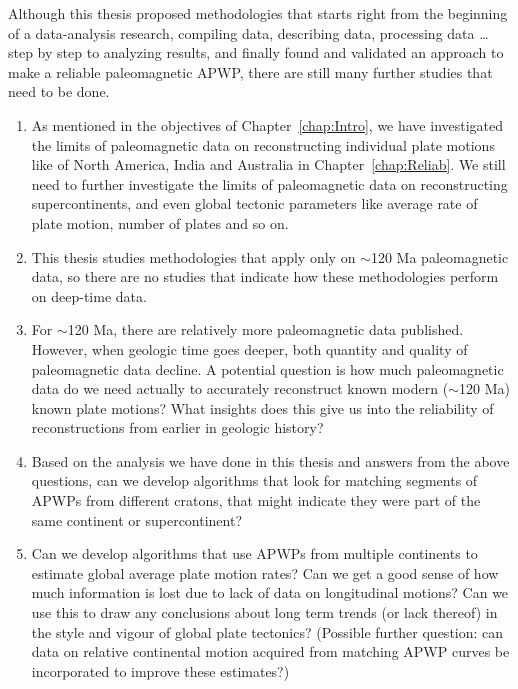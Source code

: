 Although this thesis proposed methodologies that starts right from the
beginning of a data-analysis research, compiling data, describing data,
processing data \ldots step by step to analyzing results, and finally found and
validated an approach to make a reliable paleomagnetic APWP, there are still
many further studies that need to be done.
%
\begin{enumerate}
  \item As mentioned in the objectives of Chapter~\ref{chap:Intro}, we have
  investigated the limits of paleomagnetic data on reconstructing individual
  plate motions like of North America, India and Australia in
  Chapter~\ref{chap:Reliab}. We still need to further investigate the limits of
  paleomagnetic data on reconstructing supercontinents, and even global tectonic
  parameters like average rate of plate motion, number of plates and so on.
  \item This thesis studies methodologies that apply only on
  $\sim$120 Ma paleomagnetic data, so there are no studies that
  indicate how these methodologies perform on deep-time data.
  \item For $\sim$120 Ma, there are relatively more paleomagnetic
  data published. However, when geologic time goes deeper, both quantity and
  quality of paleomagnetic data decline. A potential question is how much
  paleomagnetic data do we need actually to accurately reconstruct known modern
  ($\sim$120 Ma) known plate motions? What insights does this give
  us into the reliability of reconstructions from earlier in geologic history?
  \item Based on the analysis we have done in this thesis and answers from the
  above questions, can we develop algorithms that look for matching segments of
  APWPs from different cratons, that might indicate they were part of the same
  continent or supercontinent?
  \item Can we develop algorithms that use APWPs from multiple continents to
  estimate global average plate motion rates? Can we get a good sense of how
  much information is lost due to lack of data on longitudinal motions? Can we
  use this to draw any conclusions about long term trends (or lack thereof) in
  the style and vigour of global plate tectonics? (Possible further question:
  can data on relative continental motion acquired from matching APWP curves be
  incorporated to improve these estimates?)
\end{enumerate}
